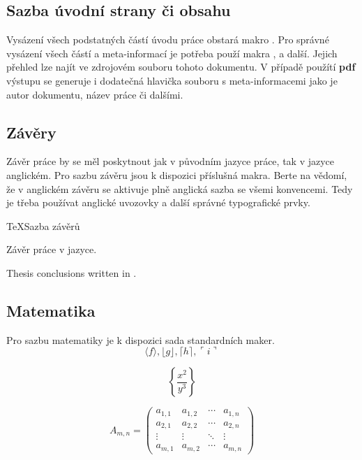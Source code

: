 \documentclass[
  biblatex,
  glossaries,
  index
]{kidiplom}
\begin{document}
\subsection{Sazba úvodní strany či obsahu}
Vysázení všech podstatných částí úvodu práce obstará makro . Pro správné vysázení všech částí a meta-informací je potřeba použí makra ,  a další. Jejich přehled lze najít ve zdrojovém souboru tohoto dokumentu. V případě použítí \textbf{pdf} výstupu se generuje i dodatečná hlavička souboru s meta-informacemi jako je autor dokumentu, název práce či dalšími.

\subsection{Závěry}
Závěr práce by se měl poskytnout jak v původním jazyce práce, tak v jazyce anglickém. Pro sazbu závěru jsou k dispozici příslušná makra. Berte na vědomí, že v anglickém závěru se aktivuje plně anglická sazba se všemi konvencemi. Tedy je třeba používat anglické uvozovky a další správné typografické prvky.

\begin{kicode}{TeX}{}{Sazba závěrů}
\begin{kiconclusions}
Závěr práce v  jazyce.
\end{kiconclusions}

\begin{kiconclusions}[english]
Thesis conclusions written in .
\end{kiconclusions}
\end{kicode}

\subsection{Matematika}
Pro sazbu matematiky je k dispozici sada standardních maker.
$$\langle f \rangle, \lfloor g \rfloor,
\lceil h \rceil, \ulcorner i \urcorner$$

$$\left\{\frac{x^2}{y^3}\right\}$$

$$
A_{m,n} =
 \begin{pmatrix}
  a_{1,1} & a_{1,2} & \cdots & a_{1,n} \\
  a_{2,1} & a_{2,2} & \cdots & a_{2,n} \\
  \vdots  & \vdots  & \ddots & \vdots  \\
  a_{m,1} & a_{m,2} & \cdots & a_{m,n}
 \end{pmatrix}
$$
\end{document}
